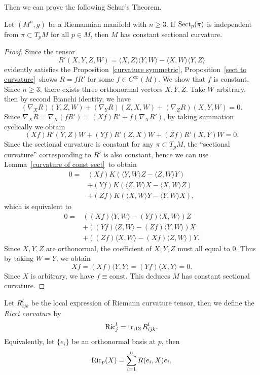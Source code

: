 Then we can prove the following Schur's Theorem.
\begin{thm}[Schur]
    Let $(M^n,g)$ be a Riemannian manifold with $n\geq 3$.
    If $\operatorname{Sect}_p(\pi)$ is independent from $\pi\subset T_pM$ for all $p\in M$, then $M$ has constant sectional curvature.
\end{thm}
\begin{proof}
    Since the tensor
    \[R'(X,Y,Z,W)=\langle X,Z\rangle\langle Y,W\rangle-\langle X,W\rangle\langle Y,Z\rangle\]
    evidently satisfies the Proposition~\ref{curvature symmetric}, Proposition~\ref{sect to curvature}~shows $R=fR'$ for some $f\in C^\infty(M)$.
    We show that $f$ is constant.
    Since $n\geq 3$, there exists three orthonormal vectors $X,Y,Z$.
    Take $W$ arbitrary, then by second Bianchi identity, we have
    \[(\nabla_XR)(Y,Z,W)+(\nabla_YR)(Z,X,W)+(\nabla_ZR)(X,Y,W)=0.\]
    Since $\nabla_XR=\nabla_X(fR')=(Xf)R'+f(\nabla_XR')$, by taking summation cyclically we obtain
    \[(Xf)R'(Y,Z)W+(Yf)R'(Z,X)W+(Zf)R'(X,Y)W=0.\]
    Since the sectional curvature is constant for any $\pi\subset T_pM$, the ``sectional curvature'' corresponding to $R'$ is also constant, hence we can use Lemma~\ref{curvature of const sect}~to obtain
    \begin{align*}
        0=&(Xf)K(\langle Y,W\rangle Z-\langle Z,W\rangle Y)\\
        &+(Yf)K(\langle Z,W\rangle X-\langle X,W\rangle Z)\\
        &+(Zf)K(\langle X,W\rangle Y-\langle Y,W\rangle X),
    \end{align*}
    which is equivalent to
    \begin{align*}
        0=&((Xf)\langle Y,W\rangle-(Yf)\langle X,W\rangle)Z\\
        &+((Yf)\langle Z,W\rangle-(Zf)\langle Y,W\rangle)X\\
        &+((Zf)\langle X,W\rangle-(Xf)\langle Z,W\rangle)Y.
    \end{align*}
    Since $X,Y,Z$ are orthonormal, the coefficient of $X,Y,Z$ must all equal to $0$.
    Thus by taking $W=Y$, we obtain
    \[Xf=(Xf)\langle Y,Y\rangle=(Yf)\langle X,Y\rangle=0.\]
    Since $X$ is arbitrary, we have $f\equiv\text{const}$.
    This deduces $M$ has constant sectional curvature.
\end{proof}

\begin{defn}
    Let $R^l_{ijk}$ be the local expression of Riemann curvature tensor, then we define the \emph{Ricci curvature} by
    \[\operatorname{Ric}^l_j=\operatorname{tr}_{;13}R^l_{ijk}.\]
    Equivalently, let $\{e_i\}$ be an orthonormal basis at $p$, then
    \[\operatorname{Ric}_p(X)=\sum_{i=1}^nR(e_i,X)e_i.\]
\end{defn}

